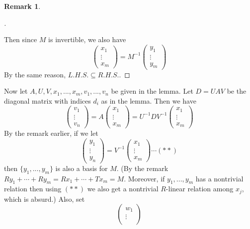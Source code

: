 \documentclass{article}
\theoremstyle{definition}
\newtheorem{rem}{Remark}
\newenvironment{proofs}[1][\proofname]{%
  \begin{proof}[#1]$ $\par\nobreak\ignorespaces
}{%
  \end{proof}
}
\begin{document}
\begin{rem}
\begin{enumerate}
\begin{proofs}
				\par Then since $M$ is invertible, we also have
				\[
					\begin{pmatrix}
						x_1\\
						\vdots\\
						x_m
					\end{pmatrix}
					= M^{-1}
					\begin{pmatrix}
						y_1\\
						\vdots\\
						y_m
					\end{pmatrix}
				\]
				By the same reason, $L.H.S. \subseteq R.H.S.$.
			\end{proofs}
			Now let $A, U, V, x_1, ..., x_m, v_1, ..., v_n$ be given in the lemma.
			Let $D = U A V$ be the diagonal matrix with indices $d_i$ as in the lemma.
			Then we have
			\[
				\begin{pmatrix}
					v_1\\
					\vdots\\
					v_n
				\end{pmatrix}
				= A
				\begin{pmatrix}
					x_1\\
					\vdots\\
					x_m
				\end{pmatrix}
				= U^{-1} D V^{-1}
				\begin{pmatrix}
					x_1\\
					\vdots\\
					x_m
				\end{pmatrix}
			\]
			By the remark earlier, if we let
			\[
				\begin{pmatrix}
					y_1\\
					\vdots\\
					y_n
				\end{pmatrix}
				= V^{-1}
				\begin{pmatrix}
					x_1\\
					\vdots\\
					x_m
				\end{pmatrix}
				\cdots (**)
			\]
			then $\{y_1, ..., y_m\}$ is also a basis for $M$. 
			(By the remark $R y_1 + \cdots + R y_m = R x_1 + \cdots + T x_m = M$.
			Moreover, if $y_1, ..., y_m$ has a nontrivial relation then using $(**)$ we also get a nontrivial $R$-linear relation among $x_j$, which is absurd.)
			Also, set
			\[
				\begin{pmatrix}
					w_1\\
					\vdots\\

\end{pmatrix}\]
\end{enumerate}
\end{rem}
\end{document}
